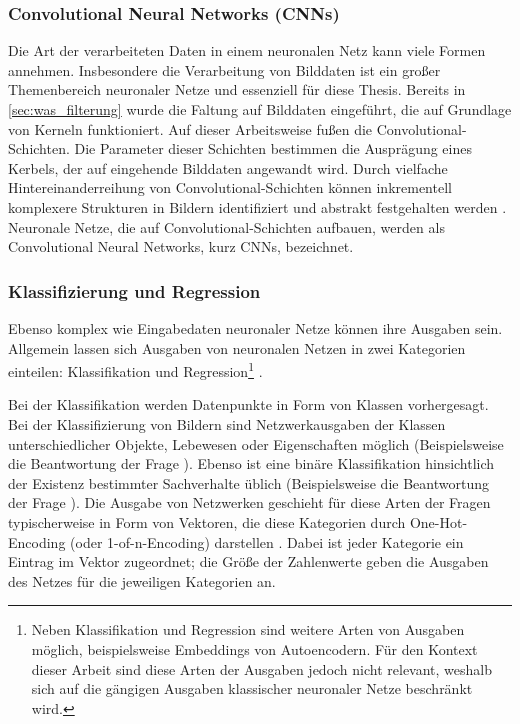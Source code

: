 \subsubsection{Convolutional Neural Networks (CNNs)}
\label{sec:cnns}

Die Art der verarbeiteten Daten in einem neuronalen Netz kann viele Formen annehmen. Insbesondere die Verarbeitung von Bilddaten ist ein großer Themenbereich neuronaler Netze und essenziell für diese Thesis. Bereits in \autoref{sec:was_filterung} wurde die Faltung auf Bilddaten eingeführt, die auf Grundlage von Kerneln funktioniert. Auf dieser Arbeitsweise fußen die Convolutional-Schichten. Die Parameter dieser Schichten bestimmen die Ausprägung eines Kerbels, der auf eingehende Bilddaten angewandt wird. Durch vielfache Hintereinanderreihung von Convolutional-Schichten können inkrementell komplexere Strukturen in Bildern identifiziert und abstrakt festgehalten werden \cite{alexnet}. Neuronale Netze, die auf Convolutional-Schichten aufbauen, werden als Convolutional Neural Networks, kurz CNNs, bezeichnet.

\subsubsection{Klassifizierung und Regression}
\label{sec:klassifizierung_regression}

Ebenso komplex wie Eingabedaten neuronaler Netze können ihre Ausgaben sein. Allgemein lassen sich Ausgaben von neuronalen Netzen in zwei Kategorien einteilen: Klassifikation und Regression\footnote{Neben Klassifikation und Regression sind weitere Arten von Ausgaben möglich, beispielsweise Embeddings von Autoencodern. Für den Kontext dieser Arbeit sind diese Arten der Ausgaben jedoch nicht relevant, weshalb sich auf die gängigen Ausgaben klassischer neuronaler Netze beschränkt wird.} \cite{nn_terminology}.

Bei der Klassifikation werden Datenpunkte in Form von Klassen vorhergesagt. Bei der Klassifizierung von Bildern sind Netzwerkausgaben der Klassen unterschiedlicher Objekte, Lebewesen oder Eigenschaften möglich (Beispielsweise die Beantwortung der Frage ). Ebenso ist eine binäre Klassifikation hinsichtlich der Existenz bestimmter Sachverhalte üblich (Beispielsweise die Beantwortung der Frage ). Die Ausgabe von Netzwerken geschieht für diese Arten der Fragen typischerweise in Form von Vektoren, die diese Kategorien durch One-Hot-Encoding (oder 1-of-n-Encoding) darstellen \cite{one_hot_encoding}. Dabei ist jeder Kategorie ein Eintrag im Vektor zugeordnet; die Größe der Zahlenwerte geben die Ausgaben des Netzes für die jeweiligen Kategorien an.

